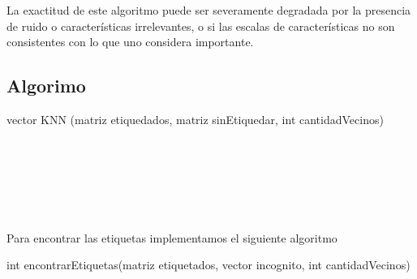 La exactitud de este algoritmo puede ser severamente degradada por la presencia de ruido o características irrelevantes, o si las escalas de características no son consistentes con lo que uno considera importante.


\subsection {Algorimo}


\begin{algorithm}
    \begin{algorithmic}[1]\parskip=2mm
        \caption{vector KNN (matriz etiquedados, matriz sinEtiquedar, int cantidadVecinos)}
        \\
        \\
        \\
        \\
        \\
    \end{algorithmic}
\end{algorithm}


Para encontrar las etiquetas implementamos el siguiente algoritmo


\begin{algorithm}
    \begin{algorithmic}[1]\parskip=2mm
        \caption{int encontrarEtiquetas(matriz etiquetados, vector incognito, int cantidadVecinos)}
        \\
        \\
        \\
        \\
        \\
        \\
        \\
        \\
        \\
    \end{algorithmic}
\end{algorithm}


